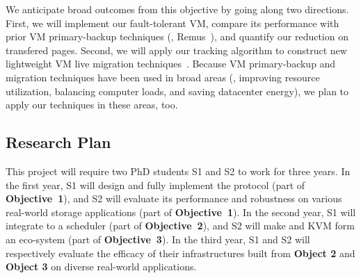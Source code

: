 
 We anticipate broad outcomes from this objective by 
going along two directions. First, we will implement our fault-tolerant VM, 
compare its performance with prior VM primary-backup techniques (\eg, 
Remus~\cite{remus:nsdi08}), and quantify our reduction on transfered pages. 
Second, we will apply our tracking algorithm to construct new lightweight VM 
live migration techniques~\cite{vmotion:atc05}. Because VM primary-backup and 
migration techniques have been used in broad areas (\eg, improving resource 
utilization, balancing computer loads, and saving datacenter energy), we plan 
to apply our techniques in these areas, too.


% 

\vspace{-.15in}\subsection{Research Plan} \label{sec:plan}\vspace{-.075in}

This project will require two PhD students S1 and S2 to work for 
three years. In the first year, S1 will design and fully implement the \falcon 
protocol (part of \textbf{Objective~1}), and S2 will evaluate its performance 
and robustness on various real-world storage applications (part of 
\textbf{Objective~1}). In the second year, S1 will 
integrate \falcon to a scheduler \mesos (part of \textbf{Objective~2}), and S2 
will make \falcon and KVM form an eco-system (part of \textbf{Objective~3}). In 
the third year, S1 and S2 will respectively evaluate the efficacy of their 
infrastructures built from \textbf{Object 2} and \textbf{Object 3} on diverse
real-world applications.


